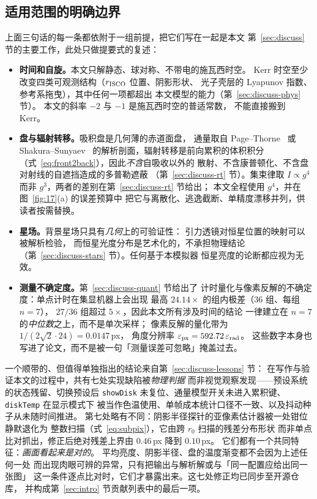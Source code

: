 \subsection{适用范围的明确边界}

上面三句话的每一条都依附于一组前提，把它们写在一起是本文
第~\ref{sec:discuss} 节的主要工作，此处只做提要式的复述：

\begin{itemize}[leftmargin=1.7em,itemsep=2pt,topsep=3pt]
  \item \textbf{时间和自旋。}本文只解静态、球对称、不带电的施瓦西时空。
        Kerr 时空至少改变四类可观测结构（$r_{\mathrm{ISCO}}$ 位置、阴影形状、
        光子壳层的 Lyapunov 指数、参考系拖曳），其中任何一项都超出
        本文模型的能力（第~\ref{sec:discuss-phys} 节）。
        本文的斜率 $-2$ 与 $-1$ 是施瓦西时空的普适常数，
        不能直接搬到 Kerr。
  \item \textbf{盘与辐射转移。}吸积盘是几何薄的赤道面盘，
        通量取自 Page--Thorne~\cite{pt1974} 或 Shakura--Sunyaev~\cite{ss1973}
        的解析剖面，辐射转移是前向累积的体积积分
        （式~\eqref{eq:front2back}），因此\emph{不含}自吸收以外的
        散射、不含康普顿化、不含盘对射线的自遮挡造成的多普勒遮蔽
        （第~\ref{sec:discuss-rt} 节）。集束律取 $I\propto g^{4}$
        而非 $g^{3}$，两者的差别在第~\ref{sec:discuss-rt} 节给出；
        本文全程使用 $g^{4}$，并在图~\ref{fig:17}(a) 的误差预算中
        把它与离散化、逃逸截断、单精度漂移并列，供读者按需替换。
  \item \textbf{星场。}背景星场只具有\emph{几何}上的可验证性：
        引力透镜对恒星位置的映射可以被解析检验，
        而恒星光度分布是艺术化的，不承担物理结论
        （第~\ref{sec:discuss-stars} 节）。任何基于本模拟器
        恒星亮度的论断都应视为无效。
  \item \textbf{测量不确定度。}第~\ref{sec:discuss-quant} 节给出了
        计时量化与像素反解的不确定度：单点计时在集显机器上会出现
        最高 $24.14\times$ 的组内极差（$36$ 组、每组 $n=7$），
        $27/36$ 组超过 $5\times$，因此本文所有涉及时间的结论
        一律建立在 $n=7$ 的\emph{中位数}之上，而不是单次采样；
        像素反解的量化带为 $1/(2\sqrt2\cdot24)=0.0147$\,px，
        角度分辨率 $\varepsilon_{\rm px}=592.72\,\varepsilon_{\rm rad}$。
        这些数字本身也写进了论文，而不是被一句「测量误差可忽略」掩盖过去。
\end{itemize}

一个顺带的、但值得单独指出的结论来自第~\ref{sec:discuss-lessons} 节：
在写作与验证本文的过程中，共有七处实现缺陷被\emph{物理判据}
而非视觉观察发现——预设系统的状态残留、切换预设后 \texttt{showDisk}
未复位、通量模型开关未进入累积键、\texttt{diskTemp} 在显示模式下
被当作色温使用、单帧成本统计口径不一致、以及抖动种子从未随时间推进。
第七处略有不同：阴影半径探针的亚像素估计器被一处钳位静默退化为
整数扫描（式~\eqref{eq:subpix}），它由跨 $r_0$ 扫描的残差分布形状
而非单点比对抓出，修正后绝对残差上界由 $0.46$\,px 降到 $0.10$\,px。
它们都有一个共同特征：\emph{画面看起来是对的}。
平均亮度、阴影半径、盘的温度渐变都不会因为上述任何一处
而出现肉眼可辨的异常，只有把输出与解析解或与「同一配置应给出同一张图」
这一条件逐点比对时，它们才暴露出来。这七处修正均已同步至开源仓库，
并构成第~\ref{sec:intro} 节贡献列表中的最后一项。

